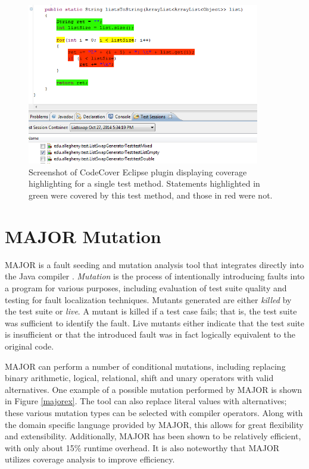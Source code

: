 \begin{figure}[tpb]
  \centering
  \includegraphics[width=4in]{img/codecovercoverage.png}
  \caption{Screenshot of CodeCover Eclipse plugin displaying coverage
  highlighting for a single test method.  Statements highlighted in green
  were covered by this test method, and those in red were not.}
  \label{codecoverage}
\end{figure}

\section{MAJOR Mutation}\label{sec:major}

MAJOR is a fault seeding and mutation analysis tool that integrates
directly into the Java compiler \cite{major}. \emph{Mutation} is the process of
intentionally introducing faults into a program for various purposes,
including evaluation of test suite quality and testing for fault
localization techniques.  Mutants generated are either \emph{killed} by
the test suite or \emph{live}.  A mutant is killed if a test case fails;
that is, the test suite was sufficient to identify the fault.  Live
mutants either indicate that the test suite is insufficient or that the
introduced fault was in fact logically equivalent to the original code.

MAJOR can perform a number of conditional mutations, including replacing
binary arithmetic, logical, relational, shift and unary operators with
valid alternatives.  One example of a possible mutation performed by
MAJOR is shown in Figure \ref{majorex}.  The tool can also replace literal
values with alternatives; these various mutation types can be selected
with compiler operators.  Along with the domain specific language
provided by MAJOR, this allows for great flexibility and extensibility.
Additionally, MAJOR has been shown to be relatively efficient, with only
about 15\% runtime overhead.  It is also noteworthy that MAJOR utilizes
coverage analysis to improve efficiency.


